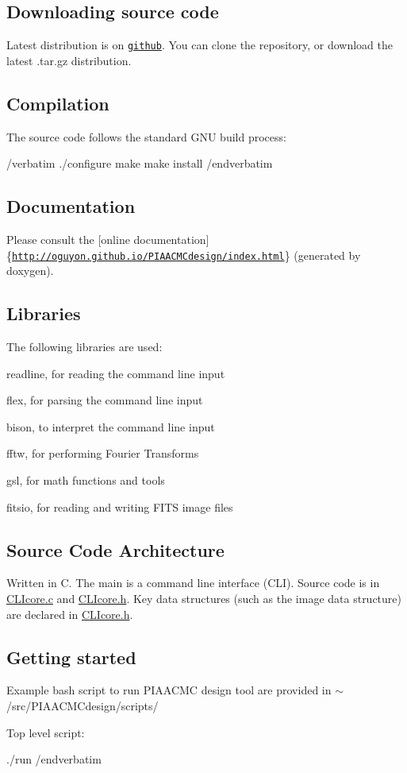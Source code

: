 \subsection*{Downloading source code}

Latest distribution is on \href{https://github.com/oguyon/PIAACMCdesign}{\tt github}. You can clone the repository, or download the latest .tar.\+gz distribution.

\subsection*{Compilation}

The source code follows the standard G\+N\+U build process\+:

/verbatim ./configure make make install /endverbatim

\subsection*{Documentation}

Please consult the \mbox{[}online documentation\mbox{]}\{\href{http://oguyon.github.io/PIAACMCdesign/index.html}{\tt http\+://oguyon.\+github.\+io/\+P\+I\+A\+A\+C\+M\+Cdesign/index.\+html}\} (generated by doxygen).

\subsection*{Libraries}

The following libraries are used\+:
\begin{DoxyItemize}
\item readline, for reading the command line input
\item flex, for parsing the command line input
\item bison, to interpret the command line input
\item fftw, for performing Fourier Transforms
\item gsl, for math functions and tools
\item fitsio, for reading and writing F\+I\+T\+S image files
\end{DoxyItemize}

\subsection*{Source Code Architecture}

Written in C. The main is a command line interface (C\+L\+I). Source code is in \hyperlink{CLIcore_8c}{C\+L\+Icore.\+c} and \hyperlink{CLIcore_8h}{C\+L\+Icore.\+h}. Key data structures (such as the image data structure) are declared in \hyperlink{CLIcore_8h}{C\+L\+Icore.\+h}.

\subsection*{Getting started}

Example bash script to run P\+I\+A\+A\+C\+M\+C design tool are provided in $\sim$/src/\+P\+I\+A\+A\+C\+M\+Cdesign/scripts/

Top level script\+: \begin{DoxyVerb}
./run
/endverbatim
\end{DoxyVerb}

